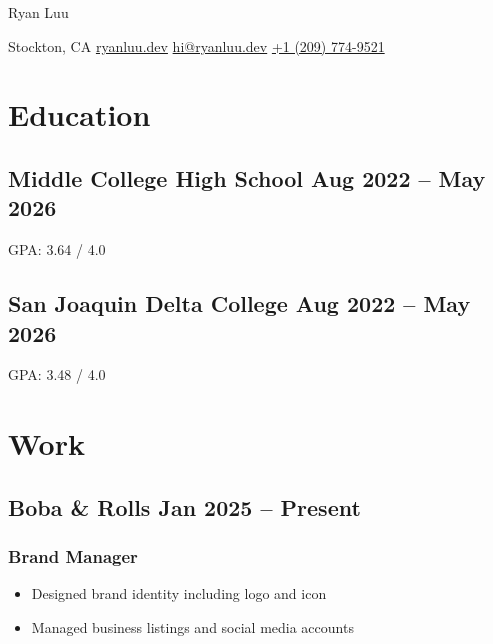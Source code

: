 \documentclass{my_cv}
\begin{document}
\centerline{\Large{Ryan Luu}}

\begin{center}
    Stockton, CA {\large\textperiodcentered} 
    \href{https://ryanluu.dev/}{ryanluu.dev} {\large\textperiodcentered} 
    \href{mailto:hi@ryanluu.dev}{hi@ryanluu.dev} {\large\textperiodcentered} 
    \href{tel:12097749521}{+1 (209) 774-9521}
\end{center}

\section{Education}

\subsection{Middle College High School \hfill Aug 2022 -- May 2026}
GPA: 3.64 / 4.0

\subsection{San Joaquin Delta College \hfill Aug 2022 -- May 2026}
GPA: 3.48 / 4.0

\section{Work}

\subsection{Boba \& Rolls \hfill Jan 2025 -- Present}
\subsubsection{Brand Manager}
\begin{itemize}
    \item Designed brand identity including logo and icon
    \item Managed business listings and social media accounts
\end{itemize}

\end{document}
